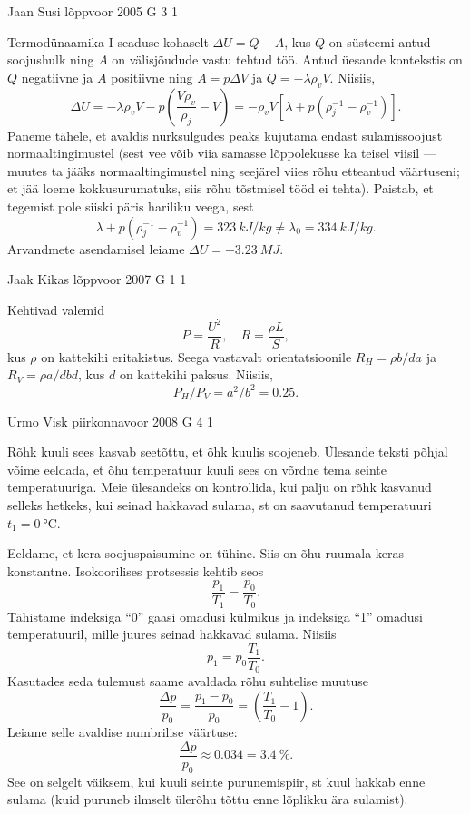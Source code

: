 \documentclass[11pt, twoside]{article}
\begin{document}
{%
{Jaan Susi} %
{lõppvoor} %
{2005} %
{G 3} %
{1} %
{

\ifSolution
Termodünaamika I seaduse kohaselt $\Delta U = Q - A$, kus $Q$ on süsteemi antud soojushulk ning $A$ on välisjõudude vastu tehtud töö. Antud üesande kontekstis on $Q$ negatiivne ja $A$ positiivne ning $A = p\Delta V$ ja $Q = -\lambda \rho_vV$. Niisiis,
\[
\Delta U=-\lambda \rho_{v} V-p\left(\frac{V \rho_{v}}{\rho_{j}}-V\right)=-\rho_{v} V\left[\lambda+p\left(\rho_{j}^{-1}-\rho_{v}^{-1}\right)\right].
\]
Paneme tähele, et avaldis nurksulgudes peaks kujutama endast sulamissoojust normaaltingimustel (sest vee võib viia samasse lõppolekusse ka teisel viisil --- muutes ta jääks normaaltingimustel ning seejärel viies rõhu etteantud väärtuseni; et jää loeme kokkusurumatuks, siis rõhu tõstmisel tööd ei tehta). Paistab, et tegemist pole siiski päris hariliku veega, sest
\[
\lambda+p\left(\rho_{j}^{-1}-\rho_{v}^{-1}\right)= \SI{323}{kJ/kg} \neq \lambda_{0}=\SI{334}{kJ/kg}.
\]
Arvandmete asendamisel leiame $\Delta U = \SI{-3,23}{MJ}$.
\fi
}

{Jaak Kikas} %
{lõppvoor} %
{2007} %
{G 1} %
{1} %
{

\ifSolution
Kehtivad valemid
\[
P=\frac{U^{2}}{R}, \quad R=\frac{\rho L}{S},
\]
kus $\rho$ on kattekihi eritakistus. Seega vastavalt orientatsioonile $R_H = \rho b/da$ ja $R_V = \rho a/db d$, kus $d$ on kattekihi paksus. Niisiis,
\[
P_H/P_V = a ^2/b^2 = \num{0,25}.
\]

\fi
}

{Urmo Visk} %
{piirkonnavoor} %
{2008} %
{G 4} %
{1} %
{

\ifSolution
Rõhk kuuli sees kasvab seetõttu, et õhk kuulis soojeneb. Ülesande teksti põhjal võime eeldada, et õhu temperatuur kuuli sees on võrdne tema seinte temperatuuriga. Meie ülesandeks on kontrollida, kui palju on rõhk kasvanud selleks hetkeks, kui seinad hakkavad sulama, st on saavutanud temperatuuri $t_1 = \SI{0}{\celsius}$. 

Eeldame, et kera soojuspaisumine on tühine. Siis on õhu ruumala keras konstantne. Isokoorilises protsessis kehtib seos 
\[
\frac{p_1}{T_1} = \frac{p_0}{T_0}.
\]
Tähistame indeksiga \enquote{0} gaasi omadusi külmikus ja indeksiga \enquote{1} omadusi temperatuuril, mille juures seinad hakkavad sulama. Niisiis 
\[
p_1 = p_0 \frac{T_1}{T_0}.
\] 
Kasutades seda tulemust saame avaldada rõhu suhtelise muutuse 
\[
\frac{\Delta p}{p_{0}}=\frac{p_{1}-p_{0}}{p_{0}}=\left(\frac{T_{1}}{T_{0}}-1\right).
\]
Leiame selle avaldise numbrilise väärtuse: 
\[
\frac{\Delta p}{p_0} \approx \num{0,034} = \SI{3,4}{\%}.
\] 
See on selgelt väiksem, kui kuuli seinte purunemispiir, st kuul hakkab enne sulama (kuid puruneb ilmselt ülerõhu tõttu enne lõplikku ära sulamist). 

}}
\end{document}
